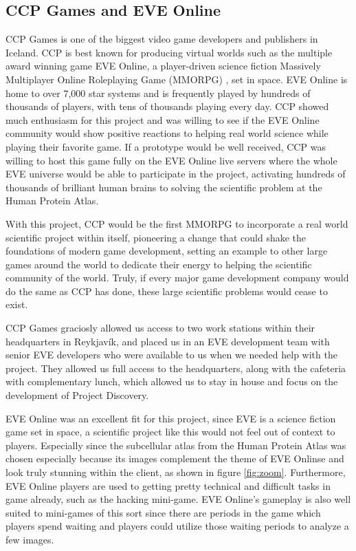 \subsection{CCP Games and EVE Online}

	CCP Games \cite{CCP} is one of the biggest video game developers and publishers in Iceland. CCP is best known for producing virtual worlds such as the multiple award winning game EVE Online, a player-driven science fiction Massively Multiplayer Online Roleplaying Game (MMORPG) \cite{mmorpg}, set in space. EVE Online is home to over 7,000 star systems and is frequently played by hundreds of thousands of players, with tens of thousands playing every day. CCP showed much enthusiasm for this project and was willing to see if the EVE Online community would show positive reactions to helping real world science while playing their favorite game. If a prototype would be well received, CCP was willing to host this game fully on the EVE Online live servers where the whole EVE universe would be able to participate in the project, activating hundreds of thousands of brilliant human brains to solving the scientific problem at the Human Protein Atlas.

	With this project, CCP would be the first MMORPG to incorporate a real world scientific project within itself, pioneering a change that could shake the foundations of modern game development, setting an example to other large games around the world to dedicate their energy to helping the scientific community of the world. Truly, if every major game development company would do the same as CCP has done, these large scientific problems would cease to exist.

	CCP Games graciosly allowed us access to two work stations within their headquarters in Reykjavík, and placed us in an EVE development team with senior EVE developers who were available to us when we needed help with the project. They allowed us full access to the headquarters, along with the cafeteria with complementary lunch, which allowed us to stay in house and focus on the development of Project Discovery.

	EVE Online was an excellent fit for this project, since EVE is a science fiction game set in space, a scientific project like this would not feel out of context to players. Especially since the subcellular atlas from the Human Protein Atlas was chosen especially because its images complement the theme of EVE Onlinse and look truly stunning within the client, as shown in figure \ref{fig:zoom}. Furthermore, EVE Online players are used to getting pretty technical and difficult tasks in game already, such as the hacking mini-game. EVE Online's gameplay is also well suited to mini-games of this sort since there are periods in the game which players spend waiting and players could utilize those waiting periods to analyze a few images.

